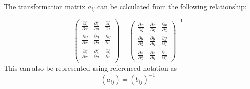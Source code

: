 The transformation matrix $a_{ij}$ can be calculated from the following relationship:

\begin{equation}
\begin{pmatrix}
\frac{\partial{\xi}}{\partial{x}} & \frac{\partial{\xi}}{\partial{y}} & \frac{\partial{\xi}}{\partial{z}}\\
\frac{\partial{\eta}}{\partial{x}} & \frac{\partial{\eta}}{\partial{y}} & \frac{\partial{\eta}}{\partial{z}}\\
\frac{\partial{\zeta}}{\partial{x}} & \frac{\partial{\zeta}}{\partial{y}} & \frac{\partial{\zeta}}{\partial{z}}\\
\end{pmatrix} 
=
\begin{pmatrix}
\frac{\partial{x}}{\partial{\xi}} & \frac{\partial{x}}{\partial{\eta}} & \frac{\partial{x}}{\partial{\zeta}}\\
\frac{\partial{y}}{\partial{\xi}} & \frac{\partial{y}}{\partial{\eta}} & \frac{\partial{y}}{\partial{\zeta}}\\
\frac{\partial{z}}{\partial{\xi}} & \frac{\partial{z}}{\partial{\eta}} & \frac{\partial{z}}{\partial{\zeta}}
\end{pmatrix}^{-1}
\label{eqn:3.15}
\end{equation}
This can also be represented using referenced notation as 
\begin{equation}
\left(a_{ij}\right) = \left(b_{ij}\right)^{-1}
\label{eqn:3.16}
\end{equation}

